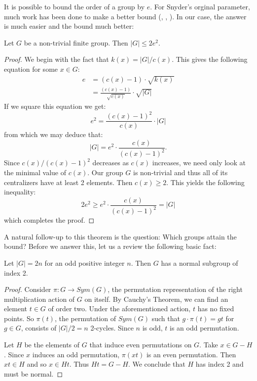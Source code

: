 \documentclass[main.tex]{subfiles}
\begin{document}
It is possible to bound the order of a group by $e$. For Snyder's orginal parameter, much work has been done to make a better bound (\cite{isaacsarticle}, \cite{durfeejensenarticle}, \cite{lewisarticle}). In our case, the answer is much easier and the bound much better:

\begin{theorem}\label{ebound}
Let $G$ be a non-trivial finite group. Then $|G| \le 2e^2$.
\end{theorem}

\begin{proof}
We begin with the fact that $k(x) = |G|/c(x)$. This gives the following equation for some $x \in G$:
\begin{align*}
e &= (c(x) - 1) \cdot \sqrt{k(x)} \\
&= \frac{(c(x) - 1)}{\sqrt{c(x)}} \cdot \sqrt{|G|}
\end{align*}
If we square this equation we get:
$$e^2 = \frac{(c(x) - 1)^2}{c(x)} \cdot |G|$$
from which we may deduce that:
$$|G| = e^2 \cdot \frac{c(x)}{(c(x) -1)^2}\text{.}$$
Since $c(x)/(c(x) - 1)^2$ decreases as $c(x)$ increases, we need only look at the minimal value of $c(x)$. Our group $G$ is non-trivial and thus all of its centralizers have at least 2 elements. Then $c(x) \ge 2$. This yields the following inequality:
$$2e^2 \ge e^2 \cdot \frac{c(x)}{(c(x) - 1)^2} = |G|$$
which completes the proof.
\end{proof}

A natural follow-up to this theorem is the question: Which groups attain the bound? Before we answer this, let us a review the following basic fact:

\begin{lemma}\label{ordernormal}
Let $|G| = 2n$ for an odd positive integer $n$. Then $G$ has a normal subgroup of index 2. 
\end{lemma}

\begin{proof}
Consider $\pi: G \to Sym(G)$, the permutation representation of the right multiplication action of $G$ on itself. By Cauchy's Theorem, we can find an element $t \in G$ of order two. Under the aforementioned action, $t$ has no fixed points. So $\pi(t)$, the permutation of $Sym(G)$ such that $g \cdot \pi(t) = gt$ for $g \in G$, consists of $|G|/2 = n$ 2-cycles. Since $n$ is odd, $t$ is an odd permutation.

Let $H$ be the elements of $G$ that induce even permutations on $G$. Take $x \in G - H$. Since $x$ induces an odd permutation, $\pi(xt)$ is an even permutation. Then $xt \in H$ and so $x \in Ht$. Thus $Ht = G- H$. We conclude that $H$ has index 2 and must be normal.
\end{proof}
\end{document}
